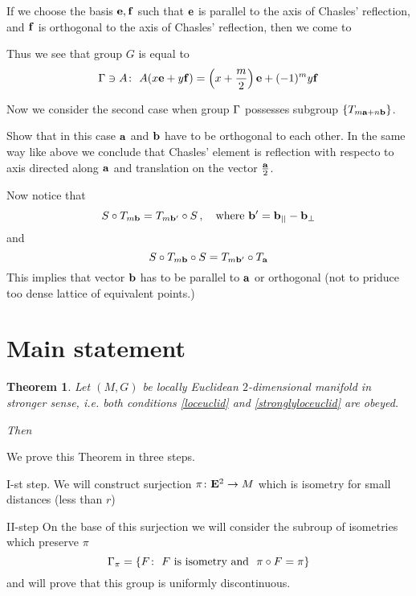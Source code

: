\documentclass[12pt]{article}
\theoremstyle{theorem}
\newtheorem{thm}{Theorem}
\theoremstyle{lemma}
\numberwithin{equation}{section}
\begin{document}
If we choose the basis ${{\bf e},{\bf f}}$ such that
  ${\bf e}$ is parallel to the axis of Chasles' reflection, and
${\bf f}$ is orthogonal to the axis of Chasles' reflection, then
we come to

Thus we see that
       group $G$ is equal to
       \begin{equation*}
 {\Gamma} \ni A\colon\,\, A(x{\bf e}+y{\bf f})=\left(x+{m\over 2}\right){\bf e}+
           (-1)^my{\bf f}
      \end{equation*}


  Now we consider the second case when
  group ${\Gamma}$ possesses subgroup $\{T_{m{\bf a}+n{\bf b}}\}$.

  Show that in this case ${\bf a}$ and ${\bf b}$ have to be orthogonal
to each other. In the same way like above we conclude that
Chasles' element is reflection with respecto to axis directed
along ${\bf a}$ and translation on the vector ${\bf a}\over 2$.

Now notice that
        \begin{equation*}
         S\circ T_{m{\bf b}}=T_{m{\bf b}'}\circ S\,,\quad
   {\rm where}\,\, {\bf b}'={\bf b}_{||}-{\bf b}_\perp
         \end{equation*}
and
        \begin{equation*}
         S\circ T_{m{\bf b}}\circ S=T_{m{\bf b}'}\circ T_{{\bf a}}
         \end{equation*}
This implies that vector ${\bf b}$ has to be parallel to ${\bf a}$
or orthogonal (not to priduce too dense lattice of 
equivalent points.)

  

\section{Main statement}

\begin{thm}
Let  $(M,G)$ be locally Euclidean $2$-dimensional manifold
in stronger sense, i.e. both conditions
\eqref{loceuclid} and \eqref{stronglyloceuclid} are obeyed.


Then  
\end{thm}

  We prove this Theorem in three steps.

  I-st step. We will construct surjection  $\pi\colon {\bf E}^2\to M$
which is isometry for small distances (less than $r$)


 \medskip

   II-step On the base of this surjection we will 
consider the subroup
of isometries which preserve $\pi$
              $$
{\Gamma}_\pi=\{F\colon \,\, F\,\, 
 \hbox{is isometry and }\,\,\pi\circ F=\pi \}
              $$ 
and will prove that this group is uniformly discontinuous.
\end{document}
